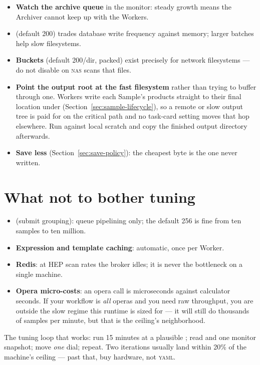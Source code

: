 \begin{itemize}
  \item \textbf{Watch the archive queue} in the monitor: steady growth means the
        Archiver cannot keep up with the Workers.
  \item {} (default 200) trades database write frequency
        against memory; larger batches help slow filesystems.
  \item \textbf{Buckets} (default 200/dir, packed) exist precisely for network
        filesystems --- do not disable  on \textsc{nas} scans that
         files.
  \item \textbf{Point the output root at the fast filesystem} rather than trying to
        buffer through one. Workers write each Sample's products straight to their final
        location under  (Section~\ref{sec:sample-lifecycle}), so a remote
        or slow output tree is paid for on the critical path and no task-card setting
        moves that hop elsewhere. Run against local scratch and copy the finished output
        directory afterwards.
  \item \textbf{Save less} (Section~\ref{sec:save-policy}): the cheapest byte is the
        one never written.
\end{itemize}

\section{What not to bother tuning}
\label{sec:perf-non-dials}

\begin{itemize}
  \item {} (submit grouping): queue pipelining only; the default
        256 is fine from ten samples to ten million.
  \item \textbf{Expression and template caching}: automatic, once per Worker.
  \item \textbf{Redis}: at HEP scan rates the broker idles; it is never the bottleneck
        on a single machine.
  \item \textbf{Opera micro-costs}: an opera call is microseconds against calculator
        seconds. If your workflow is \emph{all} operas and you need raw throughput,
        you are outside the slow regime this runtime is sized for --- it will still do
        thousands of samples per minute, but that is the ceiling's neighborhood.
\end{itemize}

\begin{jtip}
The tuning loop that works: run 15 minutes at a plausible ; read
 and one monitor snapshot; move \emph{one} dial; repeat. Two
iterations usually land within 20\% of the machine's ceiling --- past that, buy
hardware, not \textsc{yaml}.
\end{jtip}
